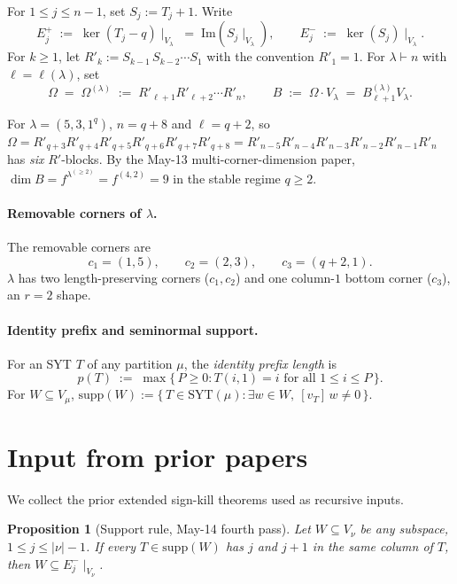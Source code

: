\documentclass[11pt]{article}
\newtheorem{proposition}[theorem]{Proposition}
\theoremstyle{definition}
\newcommand{\Vlam}{V_\lambda}
\newcommand{\Bdec}{B_{\ell+1}^{(\lambda)}}
\newcommand{\Om}{\Omega}
\newcommand{\supp}{\mathrm{supp}}
\newcommand{\SYT}{\mathrm{SYT}}
\newcommand{\Rp}{{R'}}
\begin{document}
For $1 \le j \le n-1$, set $S_j := T_j + 1$.  Write
\[
   E_j^+ \;:=\; \ker(T_j - q)\!\mid_{\Vlam}
   \;=\; \mathrm{Im}(S_j\!\mid_{\Vlam}),
   \qquad
   E_j^- \;:=\; \ker(S_j)\!\mid_{\Vlam}.
\]
For $k \ge 1$, let $\Rp_k := S_{k-1}\,S_{k-2}\cdots S_1$ with the
convention $\Rp_1 = 1$.  For $\lambda \vdash n$ with
$\ell = \ell(\lambda)$, set
\[
   \Om \;=\; \Om^{(\lambda)} \;:=\; \Rp_{\ell+1}\Rp_{\ell+2}\cdots \Rp_n,
   \qquad
   B \;:=\; \Om \cdot \Vlam \;=\; \Bdec \Vlam.
\]

For $\lambda = (5, 3, 1^q)$, $n = q + 8$ and $\ell = q + 2$, so
$\Om = \Rp_{q+3}\Rp_{q+4}\Rp_{q+5}\Rp_{q+6}\Rp_{q+7}\Rp_{q+8} =
\Rp_{n-5}\Rp_{n-4}\Rp_{n-3}\Rp_{n-2}\Rp_{n-1}\Rp_n$
has \emph{six} $\Rp$-blocks.  By the May-13 multi-corner-dimension
paper, $\dim B = f^{\lambda^{(\ge 2)}} = f^{(4, 2)} = 9$ in the stable
regime $q \ge 2$.

\paragraph{Removable corners of $\lambda$.}
The removable corners are
\[
   c_1 = (1, 5), \qquad c_2 = (2, 3), \qquad c_3 = (q+2, 1).
\]
$\lambda$ has two length-preserving corners ($c_1, c_2$) and one
column-$1$ bottom corner ($c_3$), an $r = 2$ shape.

\paragraph{Identity prefix and seminormal support.}  For an SYT $T$
of any partition $\mu$, the \emph{identity prefix length} is
\[
   p(T) \;:=\; \max\{\,P \ge 0 : T(i, 1) = i \text{ for all }
   1 \le i \le P\,\}.
\]
For $W \subseteq V_\mu$,
$\supp(W) := \{\,T \in \SYT(\mu) : \exists w \in W,\ [v_T]\,w \ne 0\,\}$.

\section{Input from prior papers}\label{sec:input}

We collect the prior extended sign-kill theorems used as recursive
inputs.

\begin{proposition}[Support rule, May-14 fourth pass]\label{prop:support-rule}
Let $W \subseteq V_\nu$ be any subspace, $1 \le j \le |\nu|-1$.
If every $T \in \supp(W)$ has $j$ and $j+1$ in the same column of $T$,
then $W \subseteq E_j^-\!\mid_{V_\nu}$.
\end{proposition}
\end{document}
